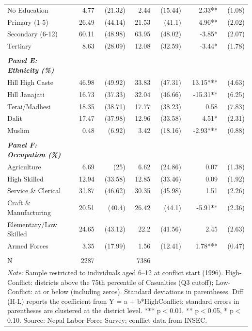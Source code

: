\begin{landscape}
\begin{table}[!h]
{\begin{tabular}[t]{lrrrrrr}
No Education & 4.77 & (21.32) & 2.44 & (15.44) & 2.33** & (1.08)\\
Primary (1-5) & 26.49 & (44.14) & 21.53 & (41.1) & 4.96** & (2.02)\\
\addlinespace
Secondary (6-12) & 60.11 & (48.98) & 63.95 & (48.02) & -3.85* & (2.07)\\
Tertiary & 8.63 & (28.09) & 12.08 & (32.59) & -3.44* & (1.78)\\
 &  &  &  &  &  & \\
\em{\textbf{Panel E: Ethnicity (\%)}} & \em{\textbf{}} & \em{\textbf{}} & \em{\textbf{}} & \em{\textbf{}} & \em{\textbf{}} & \em{\textbf{}}\\
Hill High Caste & 46.98 & (49.92) & 33.83 & (47.31) & 13.15*** & (4.63)\\
\addlinespace
Hill Janajati & 16.73 & (37.33) & 32.04 & (46.66) & -15.31** & (6.25)\\
Terai/Madhesi & 18.35 & (38.71) & 17.77 & (38.23) & 0.58 & (7.83)\\
Dalit & 17.47 & (37.98) & 12.96 & (33.58) & 4.51* & (2.31)\\
Muslim & 0.48 & (6.92) & 3.42 & (18.16) & -2.93*** & (0.88)\\
 &  &  &  &  &  & \\
\addlinespace
\em{\textbf{Panel F: Occupation (\%)}} & \em{\textbf{}} & \em{\textbf{}} & \em{\textbf{}} & \em{\textbf{}} & \em{\textbf{}} & \em{\textbf{}}\\
Agriculture & 6.69 & (25) & 6.62 & (24.86) & 0.07 & (1.38)\\
High Skilled & 12.94 & (33.58) & 12.85 & (33.46) & 0.09 & (1.92)\\
Service \& Clerical & 31.87 & (46.62) & 30.35 & (45.98) & 1.51 & (2.26)\\
Craft \& Manufacturing & 20.51 & (40.4) & 26.42 & (44.1) & -5.91** & (2.36)\\
\addlinespace
Elementary/Low Skilled & 24.65 & (43.12) & 22.2 & (41.56) & 2.45 & (2.63)\\
Armed Forces & 3.35 & (17.99) & 1.56 & (12.41) & 1.78*** & (0.47)\\
 &  &  &  &  &  & \\
N & 2287 &  & 7386 &  &  & \\
\bottomrule
\multicolumn{7}{l}{\rule{0pt}{1em}\textit{Note: } Sample restricted to individuals aged 6--12 at conflict start (1996). High-Conflict: districts above the 75th percentile of Casualties (Q3 cutoff); Low-Conflict: at or below (including zeros). Standard deviations in parentheses. Diff (H-L) reports the coefficient from Y = a + b*HighConflict; standard errors in parentheses are clustered at the district level. *** p$<$0.01, ** p$<$0.05, * p$<$0.10. Source: Nepal Labor Force Survey; conflict data from INSEC.}\\
\end{tabular}}
\end{table}
\end{landscape}
